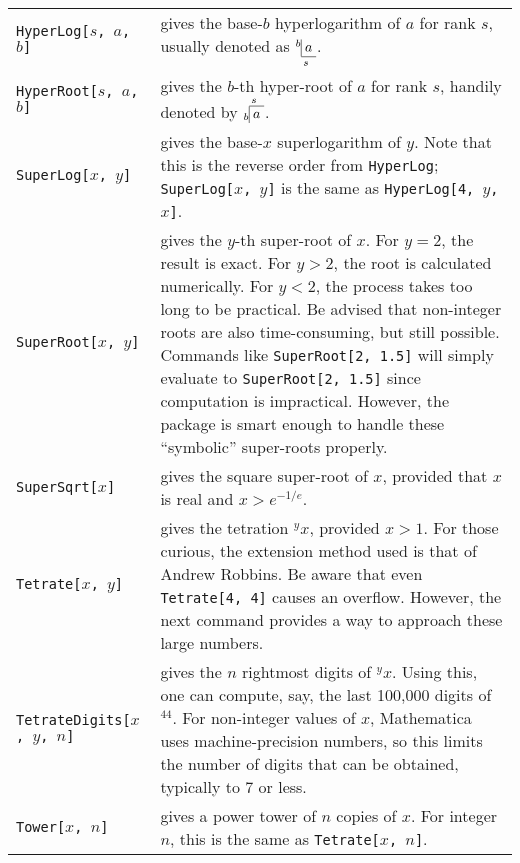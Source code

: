 \documentclass[letterpaper]{article}
\newcommand{\boxhyperlog}[3]{\underset{#2}{{}^{#1}{\begin{tabular}{|c}$\!\!{#3}\!\!$\\\hline\end{tabular}}}}
\newcommand{\boxhyperroot}[3]{\overset{#2}{{}_{#1}{\begin{tabular}{|c}\hline\!\!$#3$\!\!\end{tabular}}}}
\begin{document}
\begin{longtable}{p{1.5in}p{3.5in}}
\verb|HyperLog[|$s$\verb|, |$a$\verb|, |$b$\verb|]| & gives the base-$b$ hyperlogarithm of $a$ for rank $s$, usually denoted as $\boxhyperlog{b}{s}{a}$. \\[6pt]

\verb|HyperRoot[|$s$\verb|, |$a$\verb|, |$b$\verb|]| & gives the $b$-th hyper-root of $a$ for rank $s$, handily denoted by $\boxhyperroot{b}{s}{a}$. \\[6pt]

\verb|SuperLog[|$x$\verb|, |$y$\verb|]| & gives the base-$x$ superlogarithm of $y$.  Note that this is the reverse order from \verb|HyperLog|; \verb|SuperLog[|$x$\verb|, |$y$\verb|]| is the same as \verb|HyperLog[4, |$y$\verb|, |$x$\verb|]|. \\[6pt]

\verb|SuperRoot[|$x$\verb|, |$y$\verb|]| & gives the $y$-th super-root of $x$.  For $y =2$, the result is exact.  For $y > 2$, the root is calculated numerically.  For $y < 2$, the process takes too long to be practical.  Be advised that non-integer roots are also time-consuming, but still possible.  Commands like \verb|SuperRoot[2, 1.5]| will simply evaluate to \verb|SuperRoot[2, 1.5]| since computation is impractical.  However, the package is smart enough to handle these ``symbolic'' super-roots properly. \\[6pt]

\verb|SuperSqrt[|$x$\verb|]| & gives the square super-root of $x$, provided that $x$ is real and $x > e^{-1/e}$. \\[6pt]

\verb|Tetrate[|$x$\verb|, |$y$\verb|]| & gives the tetration $^yx$, provided $x > 1$.  For those curious, the extension method used is that of Andrew Robbins.  Be aware that even \verb|Tetrate[4, 4]| causes an overflow.  However, the next command provides a way to approach these large numbers. \\[6pt]

\verb|TetrateDigits[|$x$\verb|, |$y$\verb|, |$n$\verb|]| & gives the $n$ rightmost digits of $^yx$.  Using this, one can compute, say, the last 100,000 digits of $^44$.  For non-integer values of $x$, Mathematica uses machine-precision numbers, so this limits the number of digits that can be obtained, typically to 7 or less. \\[6pt]

\verb|Tower[|$x$\verb|, |$n$\verb|]| & gives a power tower of $n$ copies of $x$.  For integer $n$, this is the same as \verb|Tetrate[|$x$\verb|, |$n$\verb|]|. \\[6pt]


\end{longtable}
\end{document}
